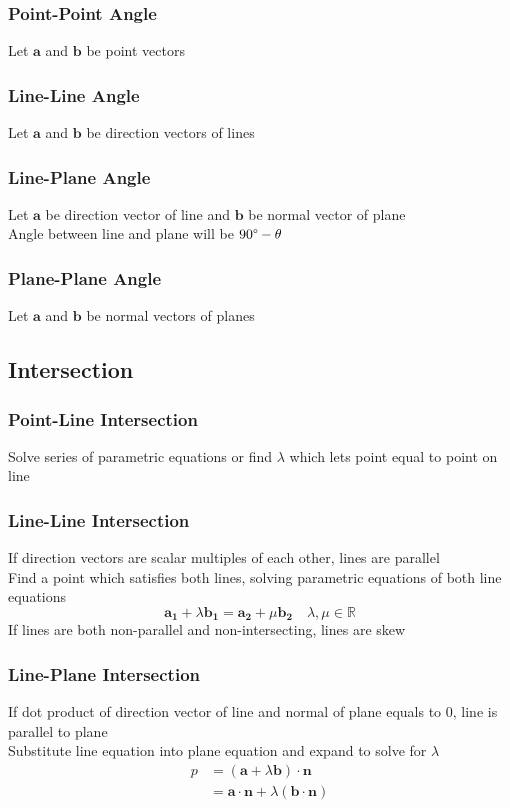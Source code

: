 \documentclass[../main]{subfiles}
\begin{document}
	\subsubsection{Point-Point Angle}
	Let \(\mathbf{a}\) and \(\mathbf{b}\) be point vectors
	\subsubsection{Line-Line Angle}
	Let \(\mathbf{a}\) and \(\mathbf{b}\) be direction vectors of lines
	\subsubsection{Line-Plane Angle}
	Let \(\mathbf{a}\) be direction vector of line and \(\mathbf{b}\) be normal vector of plane \\
	Angle between line and plane will be \(90 \degree - \theta\)
	\subsubsection{Plane-Plane Angle}
	Let \(\mathbf{a}\) and \(\mathbf{b}\) be normal vectors of planes

\subsection{Intersection}
	
	\subsubsection{Point-Line Intersection}
	Solve series of parametric equations or find \(\lambda\) which lets point equal to point on line
	\subsubsection{Line-Line Intersection}
	If direction vectors are scalar multiples of each other, lines are parallel \\
	Find a point which satisfies both lines, solving parametric equations of both line equations \\
	\[ \mathbf{a_1} + \lambda \mathbf{b_1} = \mathbf{a_2} + \mu \mathbf{b_2} \quad \lambda, \mu \in \mathbb{R} \]
	If lines are both non-parallel and non-intersecting, lines are skew
	\subsubsection{Line-Plane Intersection}
	If dot product of direction vector of line and normal of plane equals to \(0\), line is parallel to plane \\
	Substitute line equation into plane equation and expand to solve for \(\lambda\)
	\begin{equation*} \begin{split}
		p & = (\mathbf{a} + \lambda \mathbf{b}) \cdot \mathbf{n}  \\
		  & = \mathbf{a} \cdot \mathbf{n} + \lambda (\mathbf{b} \cdot \mathbf{n})
	\end{split} \end{equation*}
\end{document}
